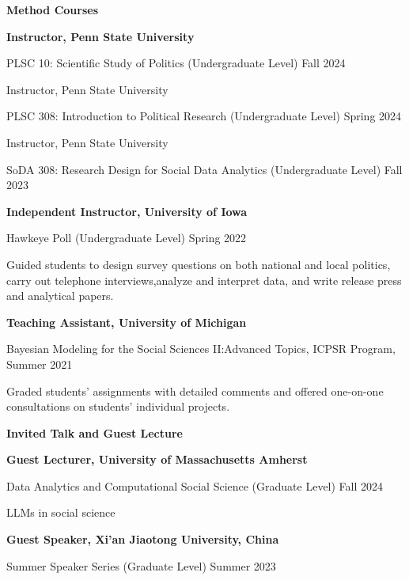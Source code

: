 \documentclass[10.5pt,]{article}
\providecommand{\tightlist}{%
	\setlength{\itemsep}{0pt}\setlength{\parskip}{0pt}}
\renewenvironment{itemize}{
	\begin{list}{}{
			\setlength{\leftmargin}{1.5em}
		}
	}{
	\end{list}
}
\begin{document}
\begin{itemize}
\tightlist
\item
  \textbf{Method Courses}

  \begin{itemize}
  \tightlist
  \item
    \textbf{Instructor, Penn State University}
  \item
    PLSC 10: Scientific Study of Politics (Undergraduate Level)
    \hfill Fall 2024
  \item
    Instructor, Penn State University
  \item
    PLSC 308: Introduction to Political Research (Undergraduate Level)
    \hfill Spring 2024
  \item
    Instructor, Penn State University
  \item
    SoDA 308: Research Design for Social Data Analytics (Undergraduate
    Level) \hfill Fall 2023
  \item
    \textbf{Independent Instructor, University of Iowa}
  \item
    Hawkeye Poll (Undergraduate Level) \hfill Spring 2022
  \item
    Guided students to design survey questions on both national and
    local politics, carry out telephone interviews,analyze and interpret
    data, and write release press and analytical papers.
  \item
    \textbf{Teaching Assistant, University of Michigan}
  \item
    Bayesian Modeling for the Social Sciences II:Advanced Topics, ICPSR
    Program, \hfill Summer 2021
  \item
    Graded students' assignments with detailed comments and offered
    one-on-one consultations on students' individual projects.
  \end{itemize}
\item
  \textbf{Invited Talk and Guest Lecture}

  \begin{itemize}
  \tightlist
  \item
    \textbf{Guest Lecturer, University of Massachusetts Amherst}
  \item
    Data Analytics and Computational Social Science (Graduate Level)
    \hfill Fall 2024

    \begin{itemize}
    \tightlist
    \item
      LLMs in social science
    \end{itemize}
  \item
    \textbf{Guest Speaker, Xi'an Jiaotong University, China}
  \item
    Summer Speaker Series (Graduate Level) \hfill Summer 2023


\end{itemize}
\end{itemize}
\end{document}
